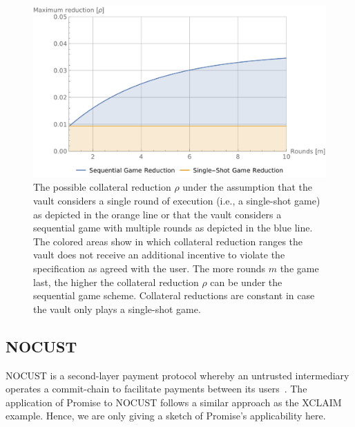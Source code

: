 \documentclass[runningheads]{llncs}
\newcommand{\sys}{Promise\xspace}
\newcommand{\dom}[1]{\todo[linecolor=green,backgroundcolor=green!25,bordercolor=green,inline,caption={}]{Comment by Dominik: #1}}
\begin{document}
\begin{figure}[t]
    \centering
    \includegraphics[width=\textwidth]{promise/figures/collateral-reduction.pdf}
    \caption{The possible collateral reduction $\rho$ under the assumption that the vault considers a single round of execution (i.e., a single-shot game) as depicted in the orange line or that the vault considers a sequential game with multiple rounds as depicted in the blue line. The colored areas show in which collateral reduction ranges the vault does not receive an additional incentive to violate the specification as agreed with the user. The more rounds $m$ the game last, the higher the collateral reduction $\rho$ can be under the sequential game scheme. Collateral reductions are constant in case the vault only plays a single-shot game.}
    \label{fig:collateral}
\end{figure}


\subsection{NOCUST}

NOCUST is a second-layer payment protocol whereby an untrusted intermediary operates a commit-chain to facilitate payments between its users~\cite{Khalil2019NOCUST}.
The application of \sys to NOCUST follows a similar approach as the XCLAIM example.
Hence, we are only giving a sketch of \sys's applicability here.
\end{document}
